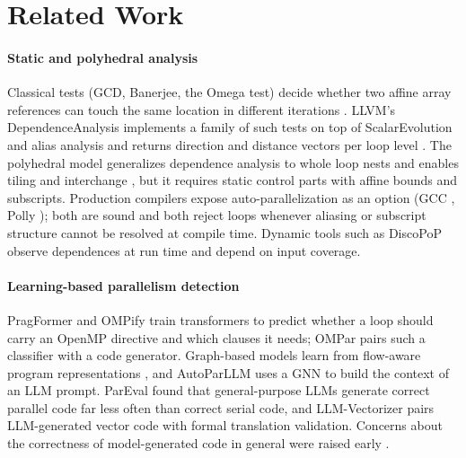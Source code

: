 \section{Related Work}
\label{sec:related}

\paragraph{Static and polyhedral analysis} Classical tests (GCD, Banerjee, the Omega test) decide whether two affine array references can touch the same location in different iterations \cite{banerjee1988,pugh1992}. LLVM's DependenceAnalysis implements a family of such tests on top of ScalarEvolution \cite{pop2005} and alias analysis and returns direction and distance vectors per loop level \cite{lattner2004,llvmda}. The polyhedral model generalizes dependence analysis to whole loop nests and enables tiling and interchange \cite{feautrier1991,bondhugula2008,grosser2012}, but it requires static control parts with affine bounds and subscripts. Production compilers expose auto-parallelization as an option (GCC , Polly ); both are sound and both reject loops whenever aliasing or subscript structure cannot be resolved at compile time. Dynamic tools such as DiscoPoP \cite{li2016discopop} observe dependences at run time and depend on input coverage.

\paragraph{Learning-based parallelism detection} PragFormer \cite{harel2023pragformer} and OMPify \cite{kadosh2023ompify} train transformers to predict whether a loop should carry an OpenMP directive and which clauses it needs; OMPar \cite{kadosh2024ompar} pairs such a classifier with a code generator. Graph-based models learn from flow-aware program representations \cite{chen2023graph2par}, and AutoParLLM \cite{mahmud2025autoparllm} uses a GNN to build the context of an LLM prompt. ParEval \cite{nichols2024pareval} found that general-purpose LLMs generate correct parallel code far less often than correct serial code, and LLM-Vectorizer \cite{taneja2025llmvectorizer} pairs LLM-generated vector code with formal translation validation. Concerns about the correctness of model-generated code in general were raised early \cite{pearce2022asleep}.

